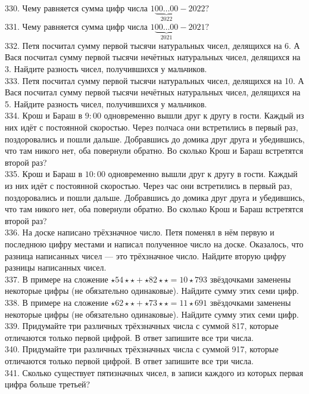 330. Чему равняется сумма цифр числа $1\underbrace{00\ldots00}_{2022}-2022?$\\
331. Чему равняется сумма цифр числа $1\underbrace{00\ldots00}_{2021}-2021?$\\
332. Петя посчитал сумму первой тысячи натуральных чисел, делящихся на 6. А Вася посчитал сумму первой тысячи нечётных натуральных чисел, делящихся на 3. Найдите разность чисел, получившихся у мальчиков.\\
333. Петя посчитал сумму первой тысячи натуральных чисел, делящихся на 10. А Вася посчитал сумму первой тысячи нечётных натуральных чисел, делящихся на 5. Найдите разность чисел, получившихся у мальчиков.\\
334. Крош и Бараш в $9:00$ одновременно вышли друг к другу в гости. Каждый из них идёт с постоянной скоростью. Через полчаса они встретились в первый раз, поздоровались и пошли дальше. Добравшись до домика друг друга и убедившись, что там никого нет, оба повернули обратно. Во сколько Крош и Бараш встретятся второй раз?\\
335. Крош и Бараш в $10:00$ одновременно вышли друг к другу в гости. Каждый из них идёт с постоянной скоростью. Через час они встретились в первый раз, поздоровались и пошли дальше. Добравшись до домика друг друга и убедившись, что там никого нет, оба повернули обратно. Во сколько Крош и Бараш встретятся второй раз?\\
336. На доске написано трёхзначное число. Петя поменял в нём первую и последнюю цифру местами и написал полученное число на доске. Оказалось, что разница написанных чисел --- это трёхзначное число. Найдите вторую цифру разницы написанных чисел.\\
337. В примере на сложение $\star54\star\star+\star82\star\star=10\star793$ звёздочками заменены некоторые цифры (не обязательно одинаковые). Найдите сумму этих семи цифр.\\
338. В примере на сложение $\star62\star\star+\star73\star\star=11\star691$ звёздочками заменены некоторые цифры (не обязательно одинаковые). Найдите сумму этих семи цифр.\\
339. Придумайте три различных трёхзначных числа с суммой 817, которые отличаются только первой цифрой. В ответ запишите все три числа.\\
340. Придумайте три различных трёхзначных числа с суммой 917, которые отличаются только первой цифрой. В ответ запишите все три числа.\\
341. Сколько существует пятизначных чисел, в записи каждого из которых первая цифра больше третьей?\\
